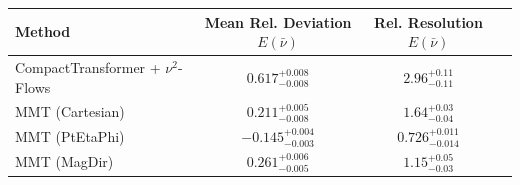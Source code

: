     \begin{tabular}{lccc}
        \toprule
        Method & Mean Rel. Deviation $E(\bar{\nu})$ & Rel. Resolution $E(\bar{\nu})$ \\
        \midrule
        CompactTransformer + $\nu^2$-Flows & $0.617^{+0.008}_{-0.008}$ & $2.96^{+0.11}_{-0.11}$ \\
        MMT (Cartesian) & $0.211^{+0.005}_{-0.008}$ & $1.64^{+0.03}_{-0.04}$ \\
        MMT (PtEtaPhi) & $-0.145^{+0.004}_{-0.003}$ & $0.726^{+0.011}_{-0.014}$ \\
        MMT (MagDir) & $0.261^{+0.006}_{-0.005}$ & $1.15^{+0.05}_{-0.03}$ \\
        \bottomrule
    \end{tabular}